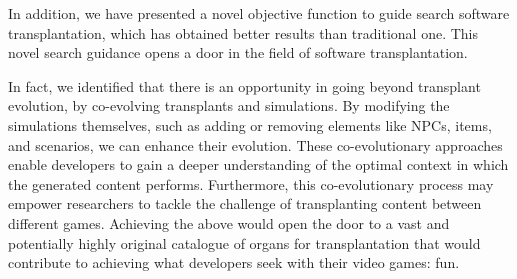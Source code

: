 In addition, we have presented a novel objective function to guide search software transplantation, which has obtained better results than traditional one. This novel search guidance opens a door in the field of software transplantation.

In fact, we identified that there is an opportunity in going beyond transplant evolution, by co-evolving transplants and simulations. By modifying the simulations themselves, such as adding or removing elements like NPCs, items, and scenarios, we can enhance their evolution. These co-evolutionary approaches enable developers to gain a deeper understanding of the optimal context in which the generated content performs. Furthermore, this co-evolutionary process may empower researchers to tackle the challenge of transplanting content between different games. Achieving the above would open the door to a vast and potentially highly original catalogue of organs for transplantation that would contribute to achieving what developers seek with their video games: fun.